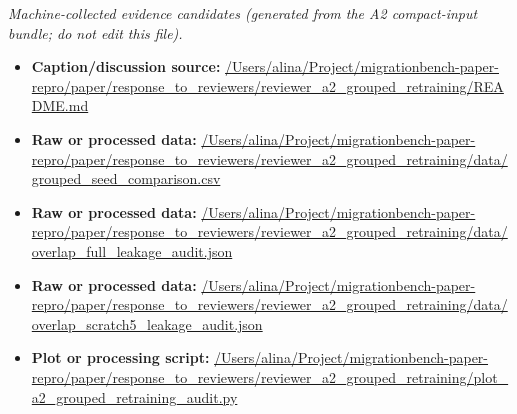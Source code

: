 \emph{Machine-collected evidence candidates (generated from the A2 compact-input bundle; do not edit this file).}
\begin{itemize}[leftmargin=1.4em,noitemsep]
\item \textbf{Caption/discussion source:} \url{/Users/alina/Project/migrationbench-paper-repro/paper/response_to_reviewers/reviewer_a2_grouped_retraining/README.md}
\item \textbf{Raw or processed data:} \url{/Users/alina/Project/migrationbench-paper-repro/paper/response_to_reviewers/reviewer_a2_grouped_retraining/data/grouped_seed_comparison.csv}
\item \textbf{Raw or processed data:} \url{/Users/alina/Project/migrationbench-paper-repro/paper/response_to_reviewers/reviewer_a2_grouped_retraining/data/overlap_full_leakage_audit.json}
\item \textbf{Raw or processed data:} \url{/Users/alina/Project/migrationbench-paper-repro/paper/response_to_reviewers/reviewer_a2_grouped_retraining/data/overlap_scratch5_leakage_audit.json}
\item \textbf{Plot or processing script:} \url{/Users/alina/Project/migrationbench-paper-repro/paper/response_to_reviewers/reviewer_a2_grouped_retraining/plot_a2_grouped_retraining_audit.py}
\end{itemize}
